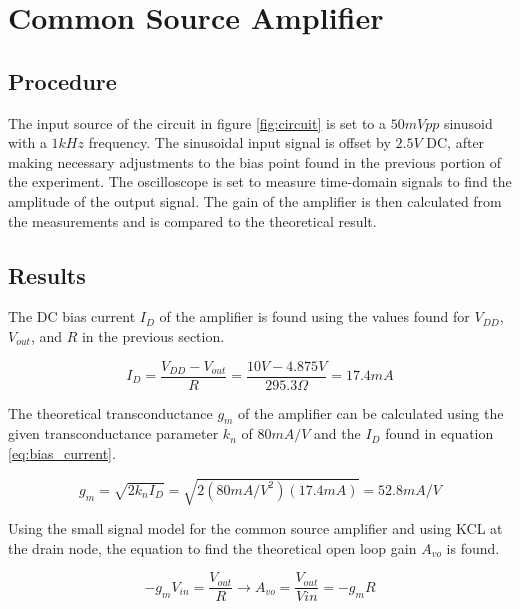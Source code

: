 \section{Common Source Amplifier}

\subsection{Procedure}

The input source of the circuit in figure \ref{fig:circuit} is set to a $50 mVpp$ sinusoid with a $1 kHz$ frequency.
The sinusoidal input signal is offset by $2.5 V$ DC, after making necessary adjustments to the bias point found in the previous portion of the experiment.
The oscilloscope is set to measure time-domain signals to find the amplitude of the output signal.
The gain of the amplifier is then calculated from the measurements and is compared to the theoretical result.

\FloatBarrier

\subsection{Results}

The DC bias current $I_D$ of the amplifier is found using the values found for $V_{DD}$, $V_{out}$, and $R$ in the previous section.

\FloatBarrier

\begin{equation}
	\label{eq:bias_current}
	I_D = \frac{V_{DD}-V_{out}}{R} = \frac{10 V - 4.875 V}{295.3 \Omega} = 17.4 mA
\end{equation}

\FloatBarrier

The theoretical transconductance $g_m$ of the amplifier can be calculated using the given transconductance parameter $k_n$ of $80 mA/V$ and the $I_D$ found in equation \ref{eq:bias_current}.

\FloatBarrier

\begin{equation}
	\label{eq:g_m}
	g_m = \sqrt{2k_nI_D} = \sqrt{2(80 mA/V^2)(17.4 mA)} = 52.8 mA/V
\end{equation}

\FloatBarrier

Using the small signal model for the common source amplifier and using KCL at the drain node, the equation to find the theoretical open loop gain $A_{vo}$ is found.

\begin{equation}
	\label{eq:ss_kcl}
	-g_mV_{in} = \frac{V_{out}}{R} \rightarrow A_{vo} = \frac{V_{out}}{V{in}} = -g_mR
\end{equation}

